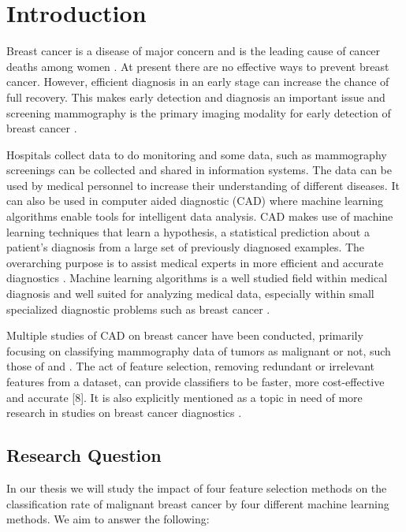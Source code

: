 \chapter{Introduction}

Breast cancer is a disease of major concern and is the leading cause of cancer deaths among women \parencite{althuis2005}. At present there are no effective ways to prevent breast cancer. However, efficient diagnosis in an early stage can increase the chance of full recovery. This makes early detection and diagnosis an important issue and screening mammography is the primary imaging modality for early detection of breast cancer \parencite{tabar2001}.

Hospitals collect data to do monitoring and some data, such as mammography screenings can be collected and shared in information systems. The data can be used by medical personnel to increase their understanding of different diseases. It can also be used in computer aided diagnostic (CAD) where machine learning algorithms enable tools for intelligent data analysis. CAD makes use of machine learning techniques that learn a hypothesis, a statistical prediction about a patient's diagnosis from a large set of previously diagnosed examples.  The overarching purpose is to assist medical experts in more efficient and accurate diagnostics \parencite{li2007}. Machine learning algorithms is a well studied field within medical diagnosis and well suited for analyzing medical data, especially within small specialized diagnostic problems such as breast cancer \parencite{kononenko2001}.

Multiple studies of CAD on breast cancer have been conducted, primarily focusing on classifying mammography data of tumors as malignant or not, such those of \textcite{ramos2012} and \textcite{akay2009}. The act of feature selection, removing redundant or irrelevant features from a dataset, can provide classifiers to be faster, more cost-effective and accurate [8]. It is also explicitly mentioned as a topic in need of more research in studies on breast cancer diagnostics \parencite{akin2011}.


\section{Research Question}

In our thesis we will study the impact of four feature selection methods on the classification rate of malignant breast cancer by four different machine learning methods. We aim to answer the following:

